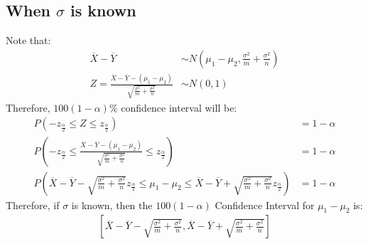 \documentclass[a4paper]{article}
\begin{document}
\subsection{When $\sigma$ is known}
Note that:
\begin{equation*}
	\begin{split}
		\overline{X} - \overline{Y} &\sim N\left( \mu_1-\mu_2, \frac{\sigma^2}{m}+\frac{\sigma^2}{n} \right)\\
		Z = \frac{\overline{X} - \overline{Y} - \left( \mu_1-\mu_2 \right) }{\sqrt{\frac{\sigma^2}{m}+\frac{\sigma^2}{n}} } &\sim N\left( 0,1\right) 
	\end{split}
\end{equation*}
Therefore, $100\left( 1-\alpha \right) \%$ confidence interval will be:
\begin{equation*}
	\begin{split}
		P\left( -z_{\frac{\alpha}{2}} \le Z \le z_\frac{\alpha}{2} \right) &=  1-\alpha\\
		P\left( -z_\frac{\alpha}{2} \le \frac{\overline{X} - \overline{Y} - \left( \mu_1-\mu_2 \right) }{\sqrt{\frac{\sigma^2}{m} + \frac{\sigma^2}{n}} } \le z_\frac{\alpha}{2}\right) &=  1-\alpha\\
		P\left( \overline{X}-\overline{Y} - \sqrt{\frac{\sigma^2}{m} + \frac{\sigma^2}{n}}z_\frac{\alpha}{2} \le \mu_1-\mu_2 \le \overline{X} -\overline{Y} +\sqrt{\frac{\sigma^2}{m}+\frac{\sigma^2}{n}}z_\frac{\alpha}{2}   \right) &= 1-\alpha 
	\end{split}
\end{equation*}
Therefore, if $\sigma$ is known, then the $100\left( 1-\alpha \right) $ Confidence Interval for $\mu_1-\mu_2$ is:
\begin{equation*}
	\begin{split}
		\left[ \overline{X} - \overline{Y} - \sqrt{\frac{\sigma^2}{m}+\frac{\sigma^2}{n}} , \overline{X} - \overline{Y} + \sqrt{\frac{\sigma^2}{m}+ \frac{\sigma^2}{n}}  \right] 
	\end{split}
\end{equation*}

\newpage
\end{document}
